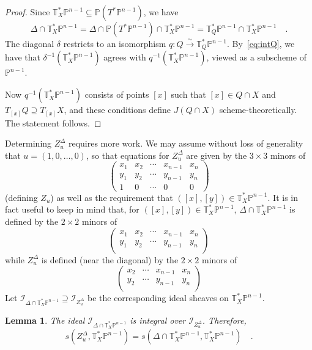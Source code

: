 \documentclass[11pt]{amsart}
\newtheorem{lemma}[theorem]{Lemma}
\numberwithin{equation}{section}
\newcommand{\Pbb}{{\mathbb{P}}}
\newcommand{\Tbb}{{\mathbb{T}}}
\newcommand{\cI}{{\mathscr I}}
\begin{document}
\begin{proof}
Since $\Tbb^*_X\Pbb^{n-1}\subseteq \Pbb(T^*\Pbb^{n-1})$, we have
\begin{equation}\label{eq:intQ}
\Delta\cap \Tbb^*_X\Pbb^{n-1} = \Delta\cap \Pbb(T^*\Pbb^{n-1})\cap \Tbb^*_X\Pbb^{n-1}
=\Tbb^*_Q\Pbb^{n-1}\cap \Tbb^*_X\Pbb^{n-1}\quad.
\end{equation}
The diagonal $\delta$ restricts to an isomorphism $q:Q\overset\sim\to \Tbb^*_Q\Pbb^{n-1}$.
By~\eqref{eq:intQ}, we have that $\delta^{-1}(\Tbb^*_X\Pbb^{n-1})$ agrees with 
$q^{-1}(\Tbb^*_X\Pbb^{n-1})$, viewed as a subscheme of $\Pbb^{n-1}$.

Now $q^{-1}(\Tbb^*_X\Pbb^{n-1})$ consists of points $[x]$ such that $[x]\in Q\cap X$
and $T_{[x]}Q\supseteq T_{[x]}X$, and these conditions define $J(Q\cap X)$
scheme-theoretically. The statement follows.
\end{proof}

Determining $Z_u^\Delta$ requires more work. We may assume
without loss of generality that $u=(1,0,\dots, 0)$, so that equations for $Z_u^\Delta$ 
are given by the $3\times 3$ minors of
\[
\begin{pmatrix}
x_1 & x_2 & \cdots & x_{n-1} & x_n \\
y_1 & y_2 & \cdots & y_{n-1} & y_n \\
1 & 0 & \cdots & 0 & 0
\end{pmatrix}
\]
(defining $Z_u$) as well as the requirement that $([x],[y])\in \Tbb^*_X\Pbb^{n-1}$. It is in fact useful to
keep in mind that, for $([x],[y])\in \Tbb^*_X\Pbb^{n-1}$, $\Delta\cap\Tbb^*_X\Pbb^{n-1}$
is defined by the $2\times 2$ minors of
\[
\begin{pmatrix}
x_1 & x_2 & \cdots & x_{n-1} & x_n \\
y_1 & y_2 & \cdots & y_{n-1} & y_n \\
\end{pmatrix}
\]
while $Z^\Delta_u$ is defined (near the diagonal) by the $2\times 2$ minors of
\[
\begin{pmatrix}
x_2 & \cdots & x_{n-1} & x_n \\
y_2 & \cdots & y_{n-1} & y_n \\
\end{pmatrix}
\]
Let $\cI_{\Delta\cap \Tbb^*_X\Pbb^{n-1}}\supseteq \cI_{Z^\Delta_u}$ be the corresponding 
ideal sheaves on $\Tbb^*_X\Pbb^{n-1}$.

\begin{lemma}\label{lem:intdep}
The ideal $\cI_{\Delta\cap \Tbb^*_X\Pbb^{n-1}}$ is integral over $\cI_{Z^\Delta_u}$.
Therefore, 
\begin{equation}\label{eq:sese}
s(Z^\Delta_u,\Tbb^*_X\Pbb^{n-1}) =  s(\Delta\cap \Tbb^*_X\Pbb^{n-1},\Tbb^*_X\Pbb^{n-1})
\quad.
\end{equation}
\end{lemma}
\end{document}

